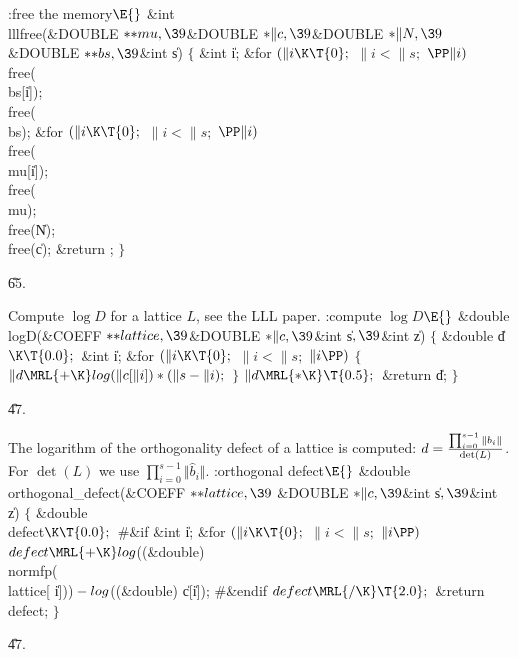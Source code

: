 \B{}:free the memory\X${}\E{}$\6
\&{int} \\{lllfree}(\&{DOUBLE} ${}{*}{*}\\{mu},\39{}$\&{DOUBLE} ${}{*}\|c,%
\39{}$\&{DOUBLE} ${}{*}\|N,\39{}$\&{DOUBLE} ${}{*}{*}\\{bs},\39{}$\&{int} \|s)\7
${}\{{}$\1\6
\&{int} \|i;\7
\&{for} ${}(\|i\K\T{0};{}$ ${}\|i<\|s;{}$ ${}\PP\|i){}$\1\5
\\{free}(\\{bs}[\|i]);\2\6
\\{free}(\\{bs});\6
\&{for} ${}(\|i\K\T{0};{}$ ${}\|i<\|s;{}$ ${}\PP\|i){}$\1\5
\\{free}(\\{mu}[\|i]);\2\6
\\{free}(\\{mu});\6
\\{free}(\|N);\6
\\{free}(\|c);\6
\&{return} ;\6
\4${}\}{}$\2\par
\U65.\fi

Compute $\log D$ for a lattice $L$, see the LLL paper.
\Y\B\4:compute $\log D$\X${}\E{}$\6
\&{double} \\{logD}(\&{COEFF} ${}{*}{*}\\{lattice},\39{}$\&{DOUBLE} ${}{*}\|c,%
\39{}$\&{int} \|s${},\39{}$\&{int} \|z)\1\1\2\2\6
${}\{{}$\1\6
\&{double} \|d${}\K\T{0.0};{}$\6
\&{int} \|i;\7
\&{for} ${}(\|i\K\T{0};{}$ ${}\|i<\|s;{}$ ${}\|i\PP){}$\5
${}\{{}$\1\6
${}\|d\MRL{+{\K}}\\{log}(\|c[\|i])*(\|s-\|i);{}$\6
\4${}\}{}$\2\6
${}\|d\MRL{*{\K}}\T{0.5};{}$\6
\&{return} \|d;\6
\4${}\}{}$\2\par
\U47.\fi

The logarithm of the orthogonality defect of a lattice is computed:
$d = {\prod_{i=0}^{s-1} \Vert b_i\Vert\over \det(L)}$.
For $\det(L)$ we use $\prod_{i=0}^{s-1} \Vert\hat b_i\Vert$.
\Y\B\4:orthogonal defect\X${}\E{}$\6
\&{double} \\{orthogonal\_defect}(\&{COEFF} ${}{*}{*}\\{lattice},\39{}$%
\&{DOUBLE} ${}{*}\|c,\39{}$\&{int} \|s${},\39{}$\&{int} \|z)\1\1\2\2\6
${}\{{}$\1\6
\&{double} \\{defect}${}\K\T{0.0};{}$\6
\8\#\&{if} \6
\&{int} \|i;\7
\&{for} ${}(\|i\K\T{0};{}$ ${}\|i<\|s;{}$ ${}\|i\PP){}$\1\5
${}\\{defect}\MRL{+{\K}}\\{log}{}$((\&{double}) \\{normfp}(\\{lattice}[%
\|i]))${}-\\{log}{}$((\&{double}) \|c[\|i]);\2\6
\8\#\&{endif}\6
${}\\{defect}\MRL{{/}{\K}}\T{2.0};{}$\6
\&{return} \\{defect};\6
\4${}\}{}$\2\par
\U47.\fi

